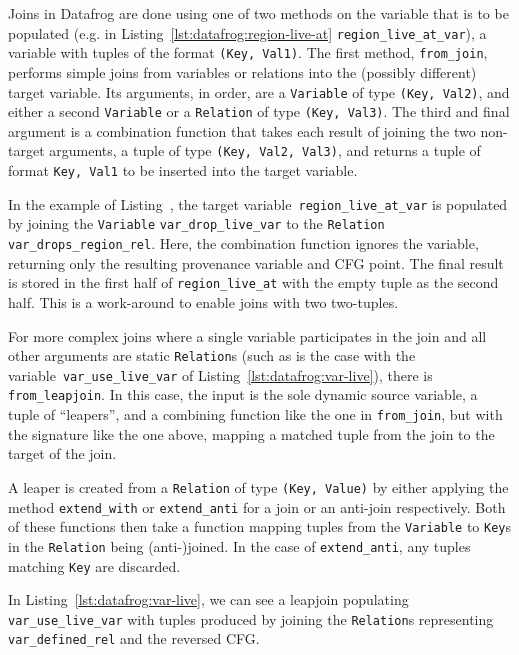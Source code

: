 \documentclass[11pt,a4paper,twoside,openany,draft]{report}
\newcommand{\InRust}[1]{\texttt{#1}}
\begin{document}
Joins in Datafrog are done using one of two methods on the variable that is to
be populated (e.g. in Listing~\ref{lst:datafrog:region-live-at}
\InRust{region_live_at_var}), a variable with tuples of the format \InRust{(Key,
  Val1)}. The first method, \InRust{from_join}, performs simple joins from
variables or relations into the (possibly different) target variable. Its
arguments, in order, are a \InRust{Variable} of type \InRust{(Key, Val2)}, and
either a second \InRust{Variable} or a \InRust{Relation} of type \InRust{(Key,
  Val3)}. The third and final argument is a combination function that takes each
result of joining the two non-target arguments, a tuple of type \InRust{(Key,
  Val2, Val3)}, and returns a tuple of format \InRust{Key, Val1} to be inserted
into the target variable.

In the example of Listing~\label{lst:datafrog:region-live-at}, the target
variable~\InRust{region_live_at_var} is populated by joining the
\InRust{Variable} \InRust{var_drop_live_var} to the \InRust{Relation}
\InRust{var_drops_region_rel}. Here, the combination function ignores the
variable, returning only the resulting provenance variable and CFG point. The
final result is stored in the first half of \InRust{region_live_at} with the
empty tuple as the second half. This is a work-around to enable joins with two
two-tuples.

For more complex joins where a single variable participates in the join and all
other arguments are static \InRust{Relation}s (such as is the case with the
variable~\InRust{var_use_live_var} of Listing~\ref{lst:datafrog:var-live}), there is
\InRust{from_leapjoin}. In this case, the input is the sole dynamic source
variable, a tuple of ``leapers'', and a combining function like the one in
\InRust{from_join}, but with the signature like the one above, mapping a matched
tuple from the join to the target of the join.

A leaper is created from a \InRust{Relation} of type \InRust{(Key, Value)} by
either applying the method \InRust{extend_with} or \InRust{extend_anti} for a
join or an anti-join respectively. Both of these functions then take a function
mapping tuples from the \InRust{Variable} to \InRust{Key}s in the
\InRust{Relation} being (anti-)joined. In the case of \InRust{extend_anti}, any
tuples matching \InRust{Key} are discarded.

In Listing~\ref{lst:datafrog:var-live}, we can see a leapjoin populating
\InRust{var_use_live_var} with tuples produced by joining the \InRust{Relation}s
representing \InRust{var_defined_rel} and the reversed CFG.
\end{document}
